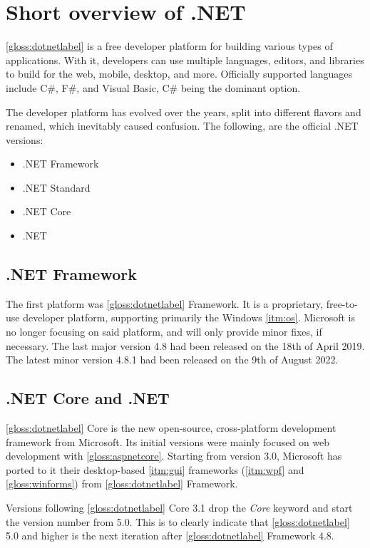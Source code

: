 \chapter{Short overview of .NET} \label{chap:overviewNET}
\ref{gloss:dotnetlabel} is a free developer platform for building various types of applications. With it, developers can use multiple languages, editors, and libraries to build for the web, mobile, desktop, and more.
Officially supported languages include C\#, F\#, and Visual Basic, C\# being the dominant option.

The developer platform has evolved over the years, split into different flavors and renamed, which inevitably caused confusion.
The following, are the official .NET versions:
\begin{itemize}
    \item .NET Framework
    \item .NET Standard
    \item .NET Core
    \item .NET
\end{itemize}

\section{.NET Framework} \label{sec:netFramework}

The first platform was \ref{gloss:dotnetlabel} Framework. It is a proprietary, free-to-use developer platform, supporting primarily the Windows \ref{itm:os}. Microsoft is no longer focusing on said platform, and will only provide minor fixes, if necessary. The last major version 4.8 had been released on the 18th of April 2019. The latest minor version 4.8.1 had been released on the 9th of August 2022.

\section{.NET Core and .NET} \label{sec:netCore}

\ref{gloss:dotnetlabel} Core is the new open-source, cross-platform development framework from Microsoft. Its initial versions were mainly focused on web development with \ref{gloss:aspnetcore}. Starting from version 3.0, Microsoft has ported to it their desktop-based \ref{itm:gui} frameworks (\ref{itm:wpf} and \ref{gloss:winforms}) from \ref{gloss:dotnetlabel} Framework.

Versions following \ref{gloss:dotnetlabel} Core 3.1 drop the \textit{Core} keyword and start the version number from 5.0. This is to clearly indicate that \ref{gloss:dotnetlabel} 5.0 and higher is the next iteration after \ref{gloss:dotnetlabel} Framework 4.8.

